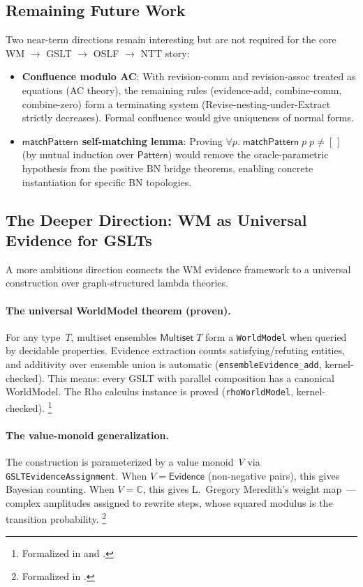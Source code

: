 \documentclass[11pt,openany]{report}
\begin{document}
\subsection{Remaining Future Work}

Two near-term directions remain interesting but are not required for the
core WM $\to$ GSLT $\to$ OSLF $\to$ NTT story:

\begin{itemize}
\item \textbf{Confluence modulo AC}:
  With revision-comm and revision-assoc treated as equations
  (AC theory), the remaining rules (evidence-add, combine-comm,
  combine-zero) form a terminating system (Revise-nesting-under-Extract
  strictly decreases).  Formal confluence would give uniqueness of
  normal forms.

\item \textbf{$\mathsf{matchPattern}$ self-matching lemma}:
  Proving $\forall p.\; \mathsf{matchPattern}\;p\;p \ne [\,]$
  (by mutual induction over $\mathsf{Pattern}$) would remove the
  oracle-parametric hypothesis from the positive BN bridge theorems,
  enabling concrete instantiation for specific BN topologies.
\end{itemize}

\subsection{The Deeper Direction: WM as Universal Evidence for GSLTs}

A more ambitious direction connects the WM evidence framework to a
universal construction over graph-structured lambda theories.

\paragraph{The universal WorldModel theorem (proven).}
For any type~$T$, multiset ensembles $\mathsf{Multiset}\;T$ form
a \texttt{WorldModel} when queried by decidable properties.  Evidence
extraction counts satisfying/refuting entities, and additivity over
ensemble union is automatic (\texttt{ensembleEvidence\_add},
kernel-checked).  This means: every GSLT with parallel composition
has a canonical WorldModel.  The Rho calculus instance is proved
(\texttt{rhoWorldModel}, kernel-checked).%
\footnote{Formalized in 
  and .}

\paragraph{The value-monoid generalization.}
The construction is parameterized by a value monoid~$V$ via
\texttt{GSLTEvidenceAssignment}.  When $V = \mathsf{Evidence}$
(non-negative pairs), this gives Bayesian counting.  When
$V = \mathbb{C}$, this gives L.~Gregory Meredith's weight
map~\cite{Meredith2026CCCPractical}---complex amplitudes assigned to
rewrite steps, whose squared modulus is the transition probability.%
\footnote{Formalized in .}
\end{document}
